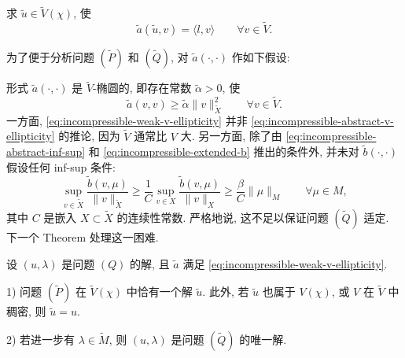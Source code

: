 求 $\widetilde u\in\widetilde V(\chi)$, 使
\begin{equation}\label{eq:incompressible-weak-p}
\widetilde a(\widetilde u,v)=\langle l,v\rangle
\qquad\forall v\in\widetilde V.
\end{equation}

为了便于分析问题 $(\widetilde P)$ 和 $(\widetilde Q)$,
对 $\widetilde a(\cdot,\cdot)$ 作如下假设:

形式 $\widetilde a(\cdot,\cdot)$ 是 $\widetilde V$-椭圆的,
即存在常数 $\widetilde\alpha>0$, 使
\begin{equation}\label{eq:incompressible-weak-v-ellipticity}
\widetilde a(v,v)
\geq\widetilde\alpha\|v\|_{\widetilde X}^2
\qquad\forall v\in\widetilde V.
\end{equation}
一方面, \eqref{eq:incompressible-weak-v-ellipticity}
并非 \eqref{eq:incompressible-abstract-v-ellipticity} 的推论,
因为 $\widetilde V$ 通常比 $V$ 大.
另一方面, 除了由 \eqref{eq:incompressible-abstract-inf-sup}
和 \eqref{eq:incompressible-extended-b} 推出的条件外,
并未对 $\widetilde b(\cdot,\cdot)$ 假设任何 inf-sup 条件:
\begin{equation}\label{eq:incompressible-restricted-weak-inf-sup}
\sup_{v\in\widetilde X}
\frac{\widetilde b(v,\mu)}{\|v\|_{\widetilde X}}
\geq\frac1C\sup_{v\in X}
\frac{\widetilde b(v,\mu)}{\|v\|_X}
\geq\frac\beta C\|\mu\|_M
\qquad\forall\mu\in M,
\end{equation}
其中 $C$ 是嵌入 $X\subset\widetilde X$ 的连续性常数.
严格地说, 这不足以保证问题 $(\widetilde Q)$ 适定.
下一个 Theorem 处理这一困难.

\begin{Theorem}\label{thm:incompressible-weak-mixed-equivalence}
设 $(u,\lambda)$ 是问题 $(Q)$ 的解, 且
$\widetilde a$ 满足
\eqref{eq:incompressible-weak-v-ellipticity}.

\textup{1)} 问题 $(\widetilde P)$ 在 $\widetilde V(\chi)$ 中恰有一个解
$\widetilde u$. 此外, 若 $\widetilde u$ 也属于 $V(\chi)$,
或 $V$ 在 $\widetilde V$ 中稠密, 则 $\widetilde u=u$.

\textup{2)} 若进一步有 $\lambda\in\widetilde M$,
则 $(u,\lambda)$ 是问题 $(\widetilde Q)$ 的唯一解.
\end{Theorem}

